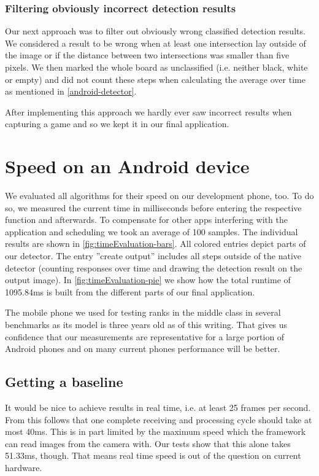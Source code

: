 	\subsubsection{Filtering obviously incorrect detection results}
	\label{evaluation-prepostprocessing-filteringOutliers-filteringWrong}
	Our next approach was to filter out obviously wrong classified detection results. We considered a result to be wrong when at least one intersection lay outside of the image or if the distance between two intersections was smaller than five pixels. We then marked the whole board as unclassified (i.e. neither black, white or empty) and did not count these steps when calculating the average over time as mentioned in \autoref{android-detector}.

	After implementing this approach we hardly ever saw incorrect results when capturing a game and so we kept it in our final application.






	\section{Speed on an Android device}
	\label{evaluation-speed}
	We evaluated all algorithms for their speed on our development phone, too. To do so, we measured the current time in milliseconds before entering the respective function and afterwards. To compensate for other apps interfering with the application and scheduling we took an average of 100 samples. The individual results are shown in \autoref{fig:timeEvaluation-bars}. All colored entries depict parts of our detector. The entry ''create output'' includes all steps outside of the native detector (counting responses over time and drawing the detection result on the output image). In \autoref{fig:timeEvaluation-pie} we show how the total runtime of 1095.84ms is built from the different parts of our final application.

	The mobile phone we used for testing ranks in the middle class in several benchmarks\cite{antutuBench,primateBench} as its model is three years old as of this writing. That gives us confidence that our measurements are representative for a large portion of Android phones and on many current phones performance will be better.

	\subsection{Getting a baseline}
	\label{evaluation-speed-baseline}
	It would be nice to achieve results in real time, i.e. at least 25 frames per second. From this follows that one complete receiving and processing cycle should take at most 40ms. This is in part limited by the maximum speed which the framework can read images from the camera with. Our tests show that this alone takes 51.33ms, though. That means real time speed is out of the question on current hardware.

